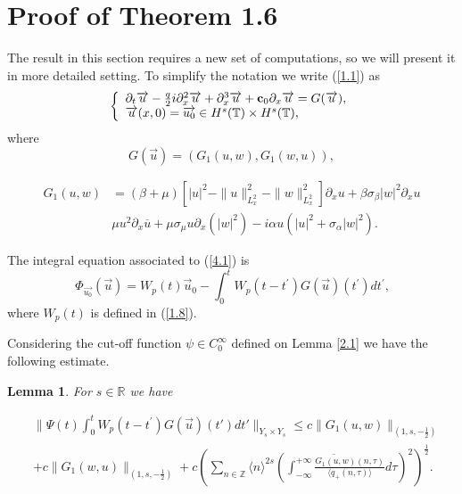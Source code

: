 \documentclass[reqno]{amsart}
\newtheorem{lemma}{Lemma}[section]
\numberwithin{equation}{section}
\begin{document}
\section{Proof of Theorem 1.6}

The result in this section requires a new set of computations, so
we will present it in more detailed setting. To simplify the notation we write (\ref{1.1}) as
\begin{equation}\label{4.1}
\left\{
\begin{array}
[c]{l}\partial_{t}\overrightarrow{u}-\frac{q}{2}i\partial_{x}^{2}\overrightarrow
{u}+\partial_{x}^{3}\overrightarrow{u}+{\bf{c}}_{0}\partial_{x}\overrightarrow
{u}= G(\overrightarrow{u}),\\
\overrightarrow{u}(x,0)=\overrightarrow{u_0}\in
H^{s}(\mathbb{T})\times H^{s}(\mathbb{T}),
\end{array}
\right.
\end{equation}
where
\[
G(\overrightarrow{u})=\left(G_{1}(u,w),G_{1}(w,u)\right),
\]

\begin{align}\label{4.2}
 G_{1}(u,w)  &  =\left(  \beta+\mu\right)  \left [| u| ^{2}-\|
u\| _{L_{x}^{2}}^{2}-\| w\| _{L_{x}^{2}}^{2}\right ]\partial_{x}u
+\beta\sigma_{\beta} | w|
^{2}\partial_{x}u\\
&  \mu u^{2}\partial_{x}\overline{u}+\mu\sigma_{\mu}u\partial_{x}(|
w| ^{2})-i\alpha u(| u|
^{2}+\sigma_{\alpha }| w|
^{2})\text{.}\nonumber
\end{align}

The integral equation associated to (\ref{4.1}) is
\begin{equation}\label{4.3}
\Phi_{\overrightarrow{u_0}}(\overrightarrow{u})=W_{p}(t)\overrightarrow
{u}_{0}-\int\nolimits_{0}^{t}W_{p}(t-t^{\prime})G(\overrightarrow
{u})(t^{\prime})dt^{\prime}\text{,}
\end{equation}
where $W_{p}(t)$ is defined in (\ref{1.8}).

Considering the cut-off function $\psi\in C_{0}^{\infty}$ defined on Lemma \ref{2.1} we
have the following estimate.

\begin{lemma}
For $s\in\mathbb{R}$ we have

\begin{equation}\label{4.7}
\begin{split}
&\| \Psi(t)\int_{0}^{t}\!W_{p}(t-t^{\prime})G(\overrightarrow{u})(t')dt'\|_{Y_{s}\times Y_{s}}
  \leq c\| G_{1}(u,w)\| _{(1,s,-\frac12)}\!\\
 &+\!c\| G_{1}(w,u)\| _{(1,s,-\frac12)}
+c\left(  \sum\limits_{n\in\mathbb{Z}}\langle n\rangle^{2s}\left(
\int_{-\infty}^{+\infty}\frac{\widetilde{G_{1}(u,w)}(n,\tau)}{\langle
q_{+}(n,\tau)\rangle}d\tau\right)  ^{2}\right)  ^{\frac{1}{2}}.
 
\end{split}
\end{equation}
\end{lemma}
\end{document}

